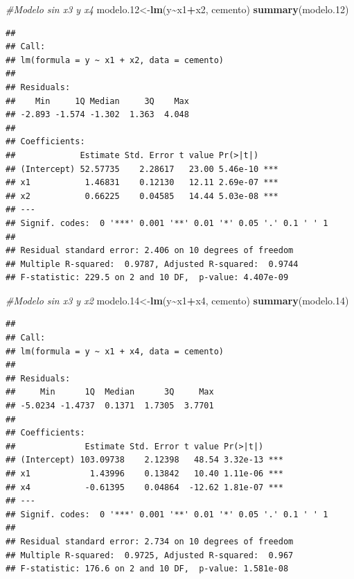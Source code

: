 \documentclass[
]{book}
\newenvironment{Shaded}{\begin{snugshade}}{\end{snugshade}}
\newcommand{\CommentTok}[1]{\textcolor[rgb]{0.56,0.35,0.01}{\textit{#1}}}
\newcommand{\FloatTok}[1]{\textcolor[rgb]{0.00,0.00,0.81}{#1}}
\newcommand{\FunctionTok}[1]{\textcolor[rgb]{0.13,0.29,0.53}{\textbf{#1}}}
\newcommand{\NormalTok}[1]{#1}
\newcommand{\OtherTok}[1]{\textcolor[rgb]{0.56,0.35,0.01}{#1}}
\newcommand{\SpecialCharTok}[1]{\textcolor[rgb]{0.81,0.36,0.00}{\textbf{#1}}}
\begin{document}
\begin{Shaded}
\begin{Highlighting}[]
\CommentTok{\#Modelo sin x3 y x4}
\NormalTok{modelo}\FloatTok{.12}\OtherTok{\textless{}{-}}\FunctionTok{lm}\NormalTok{(y}\SpecialCharTok{\textasciitilde{}}\NormalTok{x1}\SpecialCharTok{+}\NormalTok{x2, cemento)}
\FunctionTok{summary}\NormalTok{(modelo}\FloatTok{.12}\NormalTok{)}
\end{Highlighting}
\end{Shaded}

\begin{verbatim}
## 
## Call:
## lm(formula = y ~ x1 + x2, data = cemento)
## 
## Residuals:
##    Min     1Q Median     3Q    Max 
## -2.893 -1.574 -1.302  1.363  4.048 
## 
## Coefficients:
##             Estimate Std. Error t value Pr(>|t|)    
## (Intercept) 52.57735    2.28617   23.00 5.46e-10 ***
## x1           1.46831    0.12130   12.11 2.69e-07 ***
## x2           0.66225    0.04585   14.44 5.03e-08 ***
## ---
## Signif. codes:  0 '***' 0.001 '**' 0.01 '*' 0.05 '.' 0.1 ' ' 1
## 
## Residual standard error: 2.406 on 10 degrees of freedom
## Multiple R-squared:  0.9787, Adjusted R-squared:  0.9744 
## F-statistic: 229.5 on 2 and 10 DF,  p-value: 4.407e-09
\end{verbatim}

\begin{Shaded}
\begin{Highlighting}[]
\CommentTok{\#Modelo sin x3 y x2}
\NormalTok{modelo}\FloatTok{.14}\OtherTok{\textless{}{-}}\FunctionTok{lm}\NormalTok{(y}\SpecialCharTok{\textasciitilde{}}\NormalTok{x1}\SpecialCharTok{+}\NormalTok{x4, cemento)}
\FunctionTok{summary}\NormalTok{(modelo}\FloatTok{.14}\NormalTok{)}
\end{Highlighting}
\end{Shaded}

\begin{verbatim}
## 
## Call:
## lm(formula = y ~ x1 + x4, data = cemento)
## 
## Residuals:
##     Min      1Q  Median      3Q     Max 
## -5.0234 -1.4737  0.1371  1.7305  3.7701 
## 
## Coefficients:
##              Estimate Std. Error t value Pr(>|t|)    
## (Intercept) 103.09738    2.12398   48.54 3.32e-13 ***
## x1            1.43996    0.13842   10.40 1.11e-06 ***
## x4           -0.61395    0.04864  -12.62 1.81e-07 ***
## ---
## Signif. codes:  0 '***' 0.001 '**' 0.01 '*' 0.05 '.' 0.1 ' ' 1
## 
## Residual standard error: 2.734 on 10 degrees of freedom
## Multiple R-squared:  0.9725, Adjusted R-squared:  0.967 
## F-statistic: 176.6 on 2 and 10 DF,  p-value: 1.581e-08
\end{verbatim}
\end{document}
